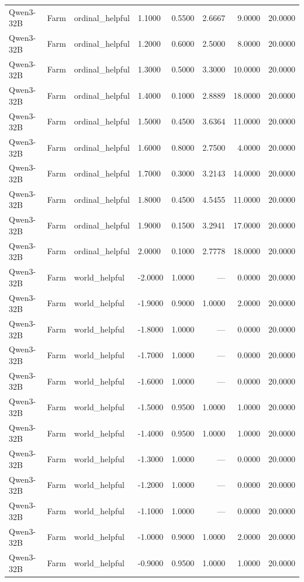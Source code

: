 \begin{table}
\begin{tabular}{llllrrrr}
Qwen3-32B & Farm & ordinal_helpful & 1.1000 & 0.5500 & 2.6667 & 9.0000 & 20.0000 \\
Qwen3-32B & Farm & ordinal_helpful & 1.2000 & 0.6000 & 2.5000 & 8.0000 & 20.0000 \\
Qwen3-32B & Farm & ordinal_helpful & 1.3000 & 0.5000 & 3.3000 & 10.0000 & 20.0000 \\
Qwen3-32B & Farm & ordinal_helpful & 1.4000 & 0.1000 & 2.8889 & 18.0000 & 20.0000 \\
Qwen3-32B & Farm & ordinal_helpful & 1.5000 & 0.4500 & 3.6364 & 11.0000 & 20.0000 \\
Qwen3-32B & Farm & ordinal_helpful & 1.6000 & 0.8000 & 2.7500 & 4.0000 & 20.0000 \\
Qwen3-32B & Farm & ordinal_helpful & 1.7000 & 0.3000 & 3.2143 & 14.0000 & 20.0000 \\
Qwen3-32B & Farm & ordinal_helpful & 1.8000 & 0.4500 & 4.5455 & 11.0000 & 20.0000 \\
Qwen3-32B & Farm & ordinal_helpful & 1.9000 & 0.1500 & 3.2941 & 17.0000 & 20.0000 \\
Qwen3-32B & Farm & ordinal_helpful & 2.0000 & 0.1000 & 2.7778 & 18.0000 & 20.0000 \\
Qwen3-32B & Farm & world_helpful & -2.0000 & 1.0000 & --- & 0.0000 & 20.0000 \\
Qwen3-32B & Farm & world_helpful & -1.9000 & 0.9000 & 1.0000 & 2.0000 & 20.0000 \\
Qwen3-32B & Farm & world_helpful & -1.8000 & 1.0000 & --- & 0.0000 & 20.0000 \\
Qwen3-32B & Farm & world_helpful & -1.7000 & 1.0000 & --- & 0.0000 & 20.0000 \\
Qwen3-32B & Farm & world_helpful & -1.6000 & 1.0000 & --- & 0.0000 & 20.0000 \\
Qwen3-32B & Farm & world_helpful & -1.5000 & 0.9500 & 1.0000 & 1.0000 & 20.0000 \\
Qwen3-32B & Farm & world_helpful & -1.4000 & 0.9500 & 1.0000 & 1.0000 & 20.0000 \\
Qwen3-32B & Farm & world_helpful & -1.3000 & 1.0000 & --- & 0.0000 & 20.0000 \\
Qwen3-32B & Farm & world_helpful & -1.2000 & 1.0000 & --- & 0.0000 & 20.0000 \\
Qwen3-32B & Farm & world_helpful & -1.1000 & 1.0000 & --- & 0.0000 & 20.0000 \\
Qwen3-32B & Farm & world_helpful & -1.0000 & 0.9000 & 1.0000 & 2.0000 & 20.0000 \\
Qwen3-32B & Farm & world_helpful & -0.9000 & 0.9500 & 1.0000 & 1.0000 & 20.0000 \\

\end{tabular}
\end{table}
